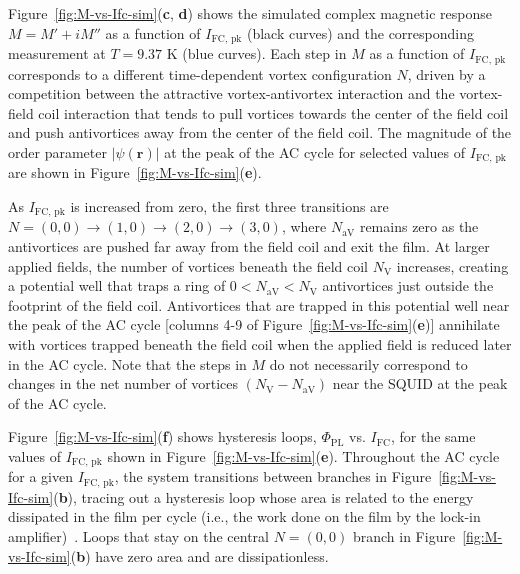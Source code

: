 \documentclass[%
 reprint,
 superscriptaddress,
 amsmath,
 amssymb,
 amsfonts,
 aps,
 prb,
]{revtex4-2}
\newcommand{\FC}{\mathrm{FC}}
\newcommand{\pk}{\mathrm{pk}}
\newcommand{\PL}{\mathrm{PL}}
\begin{document}
Figure~\ref{fig:M-vs-Ifc-sim}({\bf c}, {\bf d}) shows the simulated complex magnetic response $M=M'+iM''$ as a function of $I_{\FC,\,\pk}$ (black curves) and the corresponding measurement at $T=9.37$ K (blue curves). Each step in $M$ as a function of $I_{\FC,\,\pk}$ corresponds to a different time-dependent vortex configuration $N$, driven by a competition between the attractive vortex-antivortex interaction and the vortex-field coil interaction that tends to pull vortices towards the center of the field coil and push antivortices away from the center of the field coil. The magnitude of the order parameter $|\psi(\mathbf{r})|$ at the peak of the AC cycle for selected values of $I_{\FC,\,\pk}$ are shown in Figure~\ref{fig:M-vs-Ifc-sim}({\bf e}).

As $I_{\FC,\,\pk}$ is increased from zero, the first three transitions are $N=(0, 0)\to(1, 0)\to(2,0)\to(3,0)$, where $N_\mathrm{aV}$ remains zero as the antivortices are pushed far away from the field coil and exit the film. At larger applied fields, the number of vortices beneath the field coil $N_\mathrm{V}$ increases, creating a potential well that traps a ring of $0<N_\mathrm{aV}<N_\mathrm{V}$ antivortices just outside the footprint of the field coil. Antivortices that are trapped in this potential well near the peak of the AC cycle [columns 4-9 of Figure~\ref{fig:M-vs-Ifc-sim}({\bf e})] annihilate with vortices trapped beneath the field coil when the applied field is reduced later in the AC cycle. Note that the steps in $M$ do not necessarily correspond to changes in the net number of vortices $(N_\mathrm{V}-N_\mathrm{aV})$ near the SQUID at the peak of the AC cycle.

Figure~\ref{fig:M-vs-Ifc-sim}({\bf f}) shows hysteresis loops, $\Phi_\PL$ vs. $I_\FC$, for the same values of $I_{\FC,\,\pk}$ shown in Figure~\ref{fig:M-vs-Ifc-sim}({\bf e}). Throughout the AC cycle for a given $I_{\FC,\,\pk}$, the system transitions between branches in Figure~\ref{fig:M-vs-Ifc-sim}({\bf b}), tracing out a hysteresis loop whose area is related to the energy dissipated in the film per cycle (i.e., the work done on the film by the lock-in amplifier)~\cite{Clem1991-vq}. Loops that stay on the central $N=(0, 0)$ branch in Figure~\ref{fig:M-vs-Ifc-sim}({\bf b}) have zero area and are dissipationless.
\end{document}
